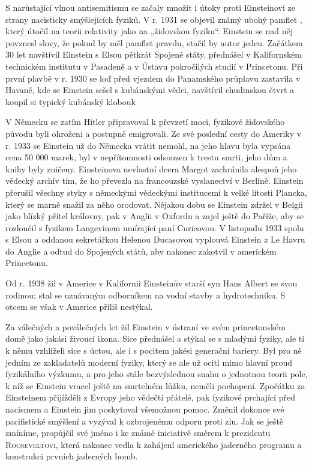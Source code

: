         S narůstající vlnou antisemitismu se začaly množit i útoky proti Einsteinovi ze strany
        nacisticky smýšlejících fyziků. V r. 1931 se objevil známý ubohý pamflet \emph{}, který útočil na teorii relativity jako na „židovskou fyziku“.
        Einstein se nad něj povznesl slovy, že pokud by měl pamflet pravdu, stačil by autor jeden.
        Začátkem 30 let navštívil Einstein s Elsou pětkrát Spojené státy, přednášel v Kalifornském
        technickém institutu v Pasadeně a v Ústavu pokročilých studií v Princetonu. Při první plavbě
        v r. 1930 se loď před vjezdem do Panamského průplavu zastavila v Havaně, kde se Einstein
        sešel s kubánskými vědci, navštívil chudinskou čtvrt a koupil si typický kubánský klobouk

        V Německu se zatím Hitler připravoval k převzetí moci, fyzikové židovského původu byli
        ohroženi a postupně emigrovali. Ze své poslední cesty do Ameriky v r. 1933 se Einstein už do
        Německa vrátit nemohl, na jeho hlavu byla vypsána cena 50 000 marek, byl v nepřítomnosti
        odsouzen k trestu smrti, jeho dům a knihy byly zničeny. Einsteinova nevlastní dcera Margot
        zachránila alespoň jeho vědecký archív tím, že ho převezla na francouzské vyslanectví v
        Berlíně. Einstein přerušil všechny styky s německými vědeckými institucemi k velké lítosti
        Plancka, který se marně snažil za něho orodovat. Nějakou dobu se Einstein zdržel v Belgii
        jako blízký přítel královny, pak v Anglii v Oxfordu a zajel ještě do Paříže, aby se
        rozloučil s fyzikem Langevinem umírající paní Curieovou. V listopadu 1933 spolu s Elsou a
        oddanou sekretářkou Helenou Ducasovou vyplouvá Einstein z Le Havru do Anglie a odtud do
        Spojených států, aby nakonec zakotvil v americkém Princetonu.

        Od r. 1938 žil v Americe v Kalifornii Einsteinův starší syn Hans Albert se svou rodinou;
        stal se uznávaným odborníkem na vodní stavby a hydrotechniku. S otcem se však v Americe
        příliš nestýkal.

        Za válečných a poválečných let žil Einstein v ústraní ve svém princetonském domě jako jakási
        živoucí ikona. Sice přednášel a stýkal se s mladými fyziky, ale ti k němu vzhlíželi sice s
        úctou, ale i s pocitem jakési generační bariery. Byl pro ně jedním ze zakladatelů moderní
        fyziky, který se ale už ocitl mimo hlavní proud fyzikálního výzkumu, a pro jeho stále
        bezvýslednou snahu o jednotnou teorii pole, k níž se Einstein vracel ještě na smrtelném
        lůžku, neměli pochopení. Zpočátku za Einsteinem přijížděli z Evropy jeho vědečtí přátelé,
        pak fyzikové prchající před nacismem a Einstein jim poskytoval všemožnou pomoc. Změnil
        dokonce své pacifistické smýšlení a vyzýval k ozbrojenému odporu proti zlu. Jak se ještě
        zmíníme, propůjčil své jméno i ke známé iniciativě směrem k prezidentu
        \textsc{Rooseveltovi}, která nakonec vedla k zahájení amerického jaderného programu a
        konstrukci prvních jaderných bomb.

